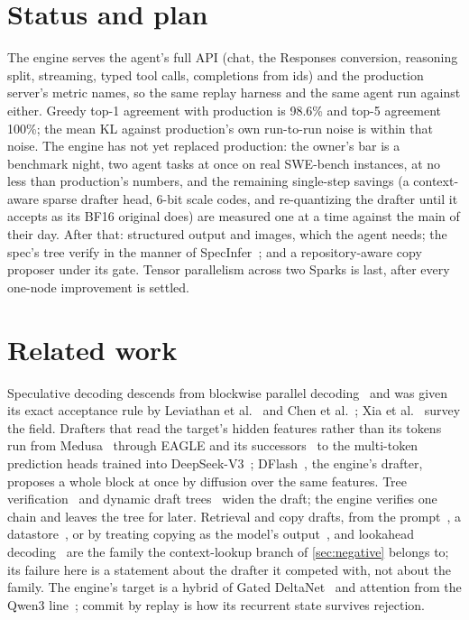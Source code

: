 \documentclass[11pt]{article}
\begin{document}
\section{Status and plan}

The engine serves the agent's full API (chat, the Responses conversion, reasoning split, streaming, typed tool calls,
completions from ids) and the production server's metric names, so the same replay harness and the same agent run
against either. Greedy top-1 agreement with production is 98.6\% and top-5 agreement 100\%; the mean KL against
production's own run-to-run noise is within that noise. The engine has not yet replaced production: the owner's bar is a
benchmark night, two agent tasks at once on real SWE-bench instances, at no less than production's numbers, and the
remaining single-step savings (a context-aware sparse drafter head, 6-bit scale codes, and re-quantizing the drafter
until it accepts as its BF16 original does) are measured one at a time against the main of their day. After that:
structured output and images, which the agent needs; the spec's tree verify in the manner of SpecInfer~\cite{miao2023specinfer}; and a repository-aware copy proposer under
its gate. Tensor parallelism across two Sparks is last, after every one-node improvement is settled.

\section{Related work}
\label{sec:related}
Speculative decoding descends from blockwise parallel decoding~\cite{stern2018blockwise} and was given its exact
acceptance rule by Leviathan et al.~\cite{leviathan2023speculative} and Chen et al.~\cite{chen2023speculative};
Xia et al.~\cite{xia2024survey} survey the field. Drafters that read the target's hidden features rather than its tokens
run from Medusa~\cite{cai2024medusa} through EAGLE and its successors~\cite{li2024eagle,li2024eagle2,li2025eagle3} to the
multi-token prediction heads trained into DeepSeek-V3~\cite{deepseek2024v3}; DFlash~\cite{chen2026dflash}, the engine's
drafter, proposes a whole block at once by diffusion over the same features. Tree verification~\cite{miao2023specinfer} and
dynamic draft trees~\cite{li2024eagle2} widen the draft; the engine verifies one chain and leaves the tree for later.
Retrieval and copy drafts, from the prompt~\cite{saxena2023pld}, a datastore~\cite{he2023rest}, or by treating copying
as the model's output~\cite{lan2023copy}, and lookahead decoding~\cite{fu2024lookahead} are the family the context-lookup
branch of \cref{sec:negative} belongs to; its failure here is a statement about the drafter it competed with, not about the
family. The engine's target is a hybrid of Gated DeltaNet~\cite{yang2024deltanet,yang2025gateddeltanet} and attention
from the Qwen3 line~\cite{qwen3tr}; commit by replay is how its recurrent state survives rejection.
\end{document}
